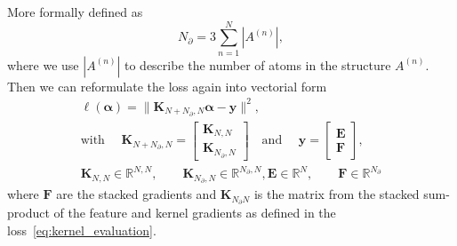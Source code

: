 More formally defined as 
\begin{equation}
  N_{\partial} = 3\sum_{n=1}^{N} |A^{(n)}|,
\end{equation}
where we use $|A^{(n)}|$ to describe the number of atoms in the structure $A^{(n)}$.
Then we can reformulate the loss again into vectorial form
\begin{subequations}
  \begin{gather}
    \ell(\boldsymbol{\alpha}) = \|\mathbf{K}_{N+N_{\partial},N}\boldsymbol{\alpha} - \mathbf{y}\|^2, \\
    \textrm{with }\quad \mathbf{K}_{N+N_{\partial},N} =
    \left[
      \begin{array}{c}
        \mathbf{K}_{N,N}\\ %
        \mathbf{K}_{N_{\partial},N}
      \end{array}
    \right]
    \quad\textrm{and }\quad \mathbf{y} = 
    \left[
      \begin{array}{c}
        \mathbf{E} \\
        \mathbf{F}%
      \end{array}
    \right],\\
    \mathbf{K}_{N,N}\in\mathbb{R}^{N,N},\qquad \mathbf{K}_{N_{\partial},N}\in\mathbb{R}^{N_{\partial},N},%
    \mathbf{E}\in\mathbb{R}^N,\qquad \mathbf{F}\in\mathbb{R}^{N_{\partial}}
  \end{gather}
\end{subequations}
where $\mathbf{F}$ are the stacked gradients and $\mathbf{K}_{N_{\partial}N}$ is the matrix from the stacked sum-product of the feature and kernel gradients as defined in the loss~\ref{eq:kernel_evaluation}.
%
%
